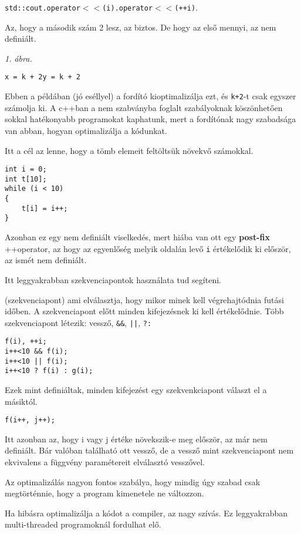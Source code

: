 \documentclass[a4paper,11.5pt]{article}
\begin{document}
	\texttt{std::cout.operator$<<$(i).operator$<<$(++i)}.
	
	Az, hogy a második szám 2 lesz, az biztos. De hogy az első mennyi, az nem definiált.
	
	\textit{1. ábra.}
	
	\begin{example}
		\texttt{x = k + 2}\quad \quad \texttt{y = k + 2}
	\end{example}
	
	Ebben a példában (jó eséllyel) a fordító kioptimalizálja ezt, és \texttt{k+2}-t csak egyszer számolja ki. A c++ban a nem szabványba foglalt szabályoknak köszönhetően sokkal hatékonyabb programokat kaphatunk, mert a fordítónak nagy szabadsága van abban, hogyan optimalizálja a kódunkat.
	
	\begin{example}
		Itt a cél az lenne, hogy a tömb elemeit feltöltsük növekvő számokkal.
		
		\begin{lstlisting}
int i = 0;
int t[10];
while (i < 10)
{
	t[i] = i++;
}
		\end{lstlisting}
		
		Azonban ez egy nem definiált viselkedés, mert hiába van ott egy \textbf{post-fix} ++\quad operator, az hogy az egyenlőség melyik oldalán levő \texttt{i} értékelődik ki először, az ismét nem definiált.
	\end{example}
	
	Itt leggyakrabban szekvenciapontok használata tud segíteni.
	
	\begin{definition}
		(szekvenciapont) ami elválasztja, hogy mikor minek kell végrehajtódnia futási időben. A szekvenciapont előtt minden kifejezésnek ki kell értékelődnie. Több szekvenciapont létezik: vessző, \texttt{\&\&}, \texttt{||}, \texttt{?\quad :} 
	\end{definition}
	\begin{example}
		\begin{lstlisting}
f(i), ++i;
i++<10 && f(i);
i++<10 || f(i);
i++<10 ? f(i) : g(i);
		\end{lstlisting}
		Ezek mint definiáltak, minden kifejezést egy szekvenkciapont választ el a másiktól.
		\begin{lstlisting}
f(i++, j++);
		\end{lstlisting}
		Itt azonban az, hogy i vagy j értéke növekszik-e meg először, az már nem definiált. Bár valóban található ott vessző, de a vessző mint szekvenciapont nem ekvivalens a függvény paramétereit elválasztó vesszővel.
	\end{example}
	\begin{note}
		Az optimalizálás nagyon fontos szabálya, hogy mindig úgy szabad csak megtörténnie, hogy a program kimenetele ne változzon. 
	\end{note}
	\begin{note}
		Ha hibásra optimalizálja a kódot a compiler, az nagy szívás. Ez leggyakrabban multi-threaded programoknál fordulhat elő.
	\end{note}
	
\end{document}
